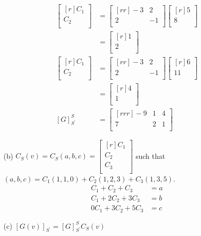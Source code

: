\documentclass{report}
\begin{document}
\begin{enumerate}
\begin{align*}
\begin{bmatrix}[r]C_1\\C_2\\\end{bmatrix}&=\begin{bmatrix}[rr]-3&2\\2&-1\\\end{bmatrix}\begin{bmatrix}[r]5\\8\\\end{bmatrix}\\
&=\begin{bmatrix}[r]1\\2\\\end{bmatrix}\\
\begin{bmatrix}[r]C_1\\C_2\\\end{bmatrix}&=\begin{bmatrix}[rr]-3&2\\2&-1\\\end{bmatrix}\begin{bmatrix}[r]6\\11\\\end{bmatrix}\\
&=\begin{bmatrix}[r]4\\1\\\end{bmatrix}\\
[G]_{S^\prime}^S&=\begin{bmatrix}[rrr]-9&1&4\\7&2&1\\\end{bmatrix}
\end{align*}
\item[(b)]
$C_S(v)=C_S(a,b,c)=\begin{bmatrix}[r]C_1\\C_2\\C_3\\\end{bmatrix}$ such that $(a,b,c)=C_1(1,1,0)+C_2(1,2,3)+C_3(1,3,5)$.
\begin{align*}
C_1+C_2+C_3 &= a\\
C_1+2C_2+3C_3 &=b\\
0C_1+3C_2+5C_3&=c
\end{align*}
\item[(c)]
$[G(v)]_{S^\prime}=[G]_{S^\prime}^SC_S(v)$
\end{enumerate}
\end{document}
